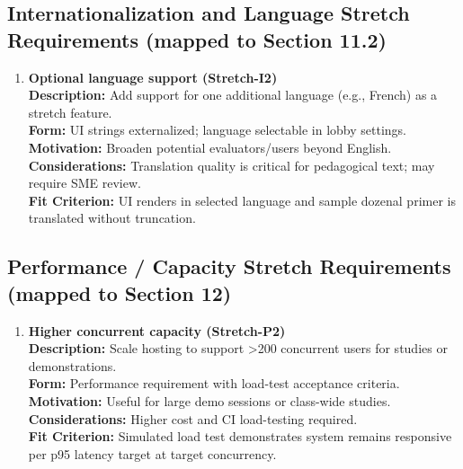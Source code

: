 \documentclass[12pt]{article}
\begin{document}
\subsection{Internationalization and Language Stretch Requirements (mapped to Section 11.2)}
\begin{enumerate}
  \item \textbf{Optional language support (Stretch-I2)}\\
  \textbf{Description:} Add support for one additional language (e.g., French) as a stretch feature.\\
  \textbf{Form:} UI strings externalized; language selectable in lobby settings.\\
  \textbf{Motivation:} Broaden potential evaluators/users beyond English.\\
  \textbf{Considerations:} Translation quality is critical for pedagogical text; may require SME review.\\
  \textbf{Fit Criterion:} UI renders in selected language and sample dozenal primer is translated without truncation.
\end{enumerate}

\subsection{Performance / Capacity Stretch Requirements (mapped to Section 12)}
\begin{enumerate}
  \item \textbf{Higher concurrent capacity (Stretch-P2)}\\
  \textbf{Description:} Scale hosting to support >200 concurrent users for studies or demonstrations.\\
  \textbf{Form:} Performance requirement with load-test acceptance criteria.\\
  \textbf{Motivation:} Useful for large demo sessions or class-wide studies.\\
  \textbf{Considerations:} Higher cost and CI load-testing required.\\
  \textbf{Fit Criterion:} Simulated load test demonstrates system remains responsive per p95 latency target at target concurrency.
\end{enumerate}
\end{document}
